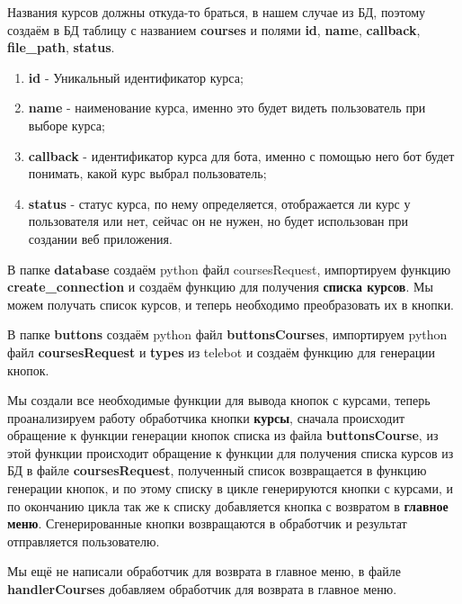 \documentclass[12pt, oldlfont, amsfonts]{report}
\begin{document}
Названия курсов должны откуда-то браться, в нашем случае из БД, поэтому создаём в БД таблицу с названием {\bf courses} и полями {\bf id}, {\bf name}, {\bf callback}, {\bf file\_path}, {\bf status}.

\begin{enumerate}
\item {\bf id} - Уникальный идентификатор курса;
\item {\bf name} - наименование курса, именно это будет видеть пользователь при выборе курса;
\item {\bf callback} - идентификатор курса для бота, именно с помощью него бот будет понимать, какой курс выбрал пользователь;
\item {\bf status} - статус курса, по нему определяется, отображается ли курс у пользователя или нет, сейчас он не нужен, но будет использован при создании веб приложения.
\end{enumerate}	

В папке {\bf database} создаём python файл {coursesRequest}, импортируем функцию {\bf create\_connection} и создаём функцию для получения {\bf списка курсов}. Мы можем получать список курсов, и теперь необходимо преобразовать их в кнопки.

В папке {\bf buttons} создаём python файл {\bf buttonsCourses}, импортируем python файл {\bf coursesRequest} и {\bf types} из telebot и создаём функцию для генерации кнопок.

Мы создали все необходимые функции для вывода кнопок с курсами, теперь проанализируем работу обработчика кнопки {\bf курсы}, сначала происходит обращение к функции генерации кнопок списка из файла {\bf buttonsCourse}, из этой функции происходит обращение к функции для получения списка курсов из БД в файле {\bf coursesRequest}, полученный список возвращается в функцию генерации кнопок, и по этому списку в цикле генерируются кнопки с курсами, и по окончанию цикла так же к списку добавляется кнопка с возвратом в {\bf главное меню}. Сгенерированные кнопки возвращаются в обработчик и результат отправляется пользователю.

Мы ещё не написали обработчик для возврата в главное меню, в файле {\bf handlerCourses} добавляем обработчик для возврата в главное меню.
\end{document}
